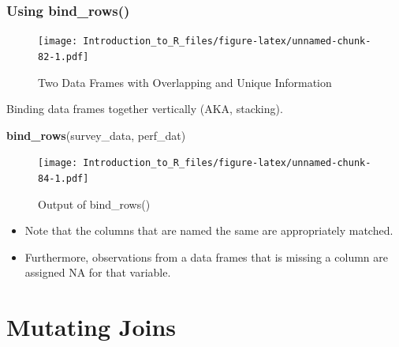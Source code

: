\documentclass[]{book}
\newenvironment{Shaded}{\begin{snugshade}}{\end{snugshade}}
\newcommand{\KeywordTok}[1]{\textcolor[rgb]{0.13,0.29,0.53}{\textbf{#1}}}
\newcommand{\NormalTok}[1]{#1}
\providecommand{\tightlist}{%
  \setlength{\itemsep}{0pt}\setlength{\parskip}{0pt}}
\theoremstyle{definition}
\theoremstyle{definition}
\theoremstyle{definition}
\theoremstyle{remark}
\let\BeginKnitrBlock\begin \let\EndKnitrBlock\end
\begin{document}
\hypertarget{using-bind_rows}{%
\subsection{Using bind\_rows()}\label{using-bind_rows}}

\begin{figure}
\centering
\texttt{[image: Introduction\_to\_R\_files/figure-latex/unnamed-chunk-82-1.pdf]}
\caption{\label{fig:unnamed-chunk-82}Two Data Frames with Overlapping and Unique Information}
\end{figure}

\BeginKnitrBlock{example}
\protect\hypertarget{exm:bindr}{}{\label{exm:bindr} }Binding data frames together vertically (AKA, stacking).
\EndKnitrBlock{example}

\begin{Shaded}
\begin{Highlighting}[]
\KeywordTok{bind_rows}\NormalTok{(survey_data, perf_dat)}
\end{Highlighting}
\end{Shaded}

\begin{figure}
\centering
\texttt{[image: Introduction\_to\_R\_files/figure-latex/unnamed-chunk-84-1.pdf]}
\caption{\label{fig:unnamed-chunk-84}Output of bind\_rows()}
\end{figure}

\begin{itemize}
\tightlist
\item
  Note that the columns that are named the same are appropriately matched.
\item
  Furthermore, observations from a data frames that is missing a column are assigned NA for that variable.
\end{itemize}

\hypertarget{mutating-joins}{%
\chapter{Mutating Joins}\label{mutating-joins}}
\end{document}

